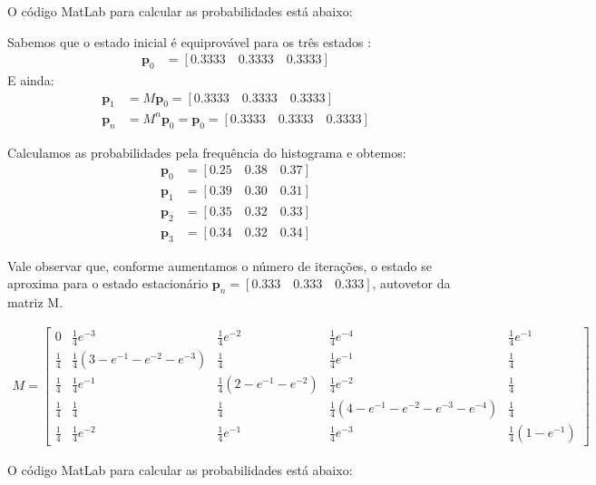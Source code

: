 \documentclass[12pt]{article}
\newenvironment{exercise}[2][Exercício]{\begin{trivlist}
\item[\hskip \labelsep {\bfseries #1}\hskip \labelsep {\bfseries #2.}]}{\end{trivlist}}
\begin{document}
\begin{exercise}{1.d}
O código MatLab para calcular as probabilidades está abaixo:


Sabemos que o estado inicial é equiprovável para os três estados :
\begin{align*}
\textbf{p}_0 &= [0.3333 \quad 0.3333 \quad 0.3333]
\end{align*} 
E ainda:
\begin{align*}
\textbf{p}_1 &= M\textbf{p}_0 = [0.3333 \quad 0.3333 \quad
0.3333] \\
\textbf{p}_n &= M^n\textbf{p}_0 = \textbf{p}_0 = [0.3333 \quad 0.3333 \quad
0.3333]
\end{align*}

Calculamos as probabilidades pela frequência do histograma e obtemos:
\begin{align*}
\textbf{p}_0 &= [0.25 \quad 0.38 \quad 0.37] \\
\textbf{p}_1 &= [0.39 \quad 0.30 \quad 0.31] \\
\textbf{p}_2 &= [0.35 \quad 0.32 \quad 0.33] \\
\textbf{p}_3 &= [0.34 \quad 0.32 \quad 0.34]
\end{align*}

Vale observar que, conforme aumentamos o número de iterações, o estado se
aproxima para o estado estacionário $\textbf{p}_n = [0.333 \quad 0.333 \quad
0.333]$, autovetor da matriz M.
\end{exercise}

\begin{exercise}{2.a}

\begin{align*}
M = \begin{bmatrix}
0 			& \frac{1}{4} e^{-3}							& \frac{1}{4} e^{-2}										& \frac{1}{4} e^{-4}									& \frac{1}{4} e^{-1} \\
\frac{1}{4} & \frac{1}{4} (3 - e^{-1} - e^{-2} - e^{-3})	& \frac{1}{4}												& \frac{1}{4} e^{-1}									& \frac{1}{4} \\
\frac{1}{4} & \frac{1}{4} e^{-1}							& \frac{1}{4} (2 - e^{-1} - e^{-2})							& \frac{1}{4} e^{-2}									& \frac{1}{4} \\
\frac{1}{4} & \frac{1}{4}									& \frac{1}{4}												& \frac{1}{4} (4 - e^{-1} - e^{-2} - e^{-3} - e^{-4})	& \frac{1}{4} \\
\frac{1}{4} & \frac{1}{4} e^{-2}							& \frac{1}{4} e^{-1}										& \frac{1}{4} e^{-3}									& \frac{1}{4} (1 - e^{-1})
\end{bmatrix}
\end{align*}
 
O código MatLab para calcular as probabilidades está abaixo:

\end{exercise}
\end{document}

